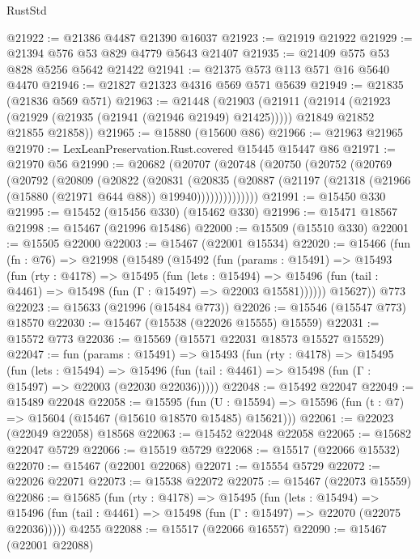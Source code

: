 \begin{lexlean}{RustStd}
\begin{coremodule}
@21922 := @21386 @4487 @21390 @16037
@21923 := @21919 @21922
@21929 := @21394 @576 @53 @829 @4779 @5643 @21407
@21935 := @21409 @575 @53 @828 @5256 @5642 @21422
@21941 := @21375 @573 @113 @571 @16 @5640 @4470
@21946 := @21827 @21323 @4316 @569 @571 @5639
@21949 := @21835 (@21836 @569 @571)
@21963 := @21448
    (@21903
      (@21911
        (@21914 (@21923 (@21929 (@21935 (@21941 (@21946 @21949) @21425)))))
        @21849
        @21852
        @21855
        @21858))
@21965 := @15880 (@15600 @86)
@21966 := @21963 @21965
@21970 := LexLeanPreservation.Rust.covered @15445 @15447 @86
@21971 := @21970 @56
@21990 := @20682
    (@20707
      (@20748
        (@20750
          (@20752
            (@20769
              (@20792
                (@20809
                  (@20822
                    (@20831
                      (@20835
                        (@20887
                          (@21197 (@21318 (@21966 (@15880 (@21971 @644 @88)) @19940))))))))))))))
@21991 := @15450 @330
@21995 := @15452 (@15456 @330) (@15462 @330)
@21996 := @15471 @18567
@21998 := @15467 (@21996 @15486)
@22000 := @15509 (@15510 @330)
@22001 := @15505 @22000
@22003 := @15467 (@22001 @15534)
@22020 := @15466
    (fun (fn : @76) =>
    @21998
      (@15489
        (@15492
          (fun (params : @15491) =>
          @15493
            (fun (rty : @4178) =>
            @15495
              (fun (lets : @15494) =>
              @15496 (fun (tail : @4461) => @15498 (fun (Γ : @15497) => @22003 @15581))))))
        @15627))
    @773
@22023 := @15633 (@21996 (@15484 @773))
@22026 := @15546 (@15547 @773) @18570
@22030 := @15467 (@15538 (@22026 @15555) @15559)
@22031 := @15572 @773
@22036 := @15569 (@15571 @22031 @18573 @15527 @15529)
@22047 := fun (params : @15491) =>
  @15493
    (fun (rty : @4178) =>
    @15495
      (fun (lets : @15494) =>
      @15496 (fun (tail : @4461) => @15498 (fun (Γ : @15497) => @22003 (@22030 @22036)))))
@22048 := @15492 @22047
@22049 := @15489 @22048
@22058 := @15595
    (fun (U : @15594) => @15596 (fun (t : @7) => @15604 (@15467 (@15610 @18570 @15485) @15621)))
@22061 := @22023 (@22049 @22058) @18568
@22063 := @15452 @22048 @22058
@22065 := @15682 @22047 @5729
@22066 := @15519 @5729
@22068 := @15517 (@22066 @15532)
@22070 := @15467 (@22001 @22068)
@22071 := @15554 @5729
@22072 := @22026 @22071
@22073 := @15538 @22072
@22075 := @15467 (@22073 @15559)
@22086 := @15685
    (fun (rty : @4178) =>
    @15495
      (fun (lets : @15494) =>
      @15496 (fun (tail : @4461) => @15498 (fun (Γ : @15497) => @22070 (@22075 @22036)))))
    @4255
@22088 := @15517 (@22066 @16557)
@22090 := @15467 (@22001 @22088)

\end{coremodule}
\end{lexlean}
